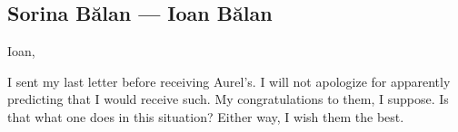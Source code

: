 \hypertarget{sorina-bux103lan-ioan-bux103lan}{%
\subsection{Sorina Bălan — Ioan Bălan}\label{sorina-bux103lan-ioan-bux103lan}}

Ioan,

I sent my last letter before receiving Aurel's. I will not apologize for apparently predicting that I would receive such. My congratulations to them, I suppose. Is that what one does in this situation? Either way, I wish them the best.
